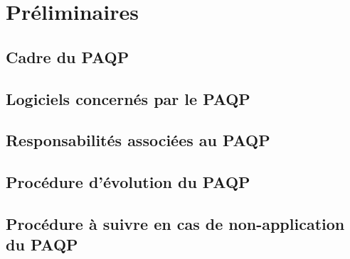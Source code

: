 
\section{Préliminaires}
    \subsection{Cadre du PAQP}

    \subsection{Logiciels concernés par le PAQP}

    \subsection{Responsabilités associées au PAQP}

    \subsection{Procédure d'évolution du PAQP}

    \subsection{Procédure à  suivre en cas de non-application du PAQP}
\pagebreak
